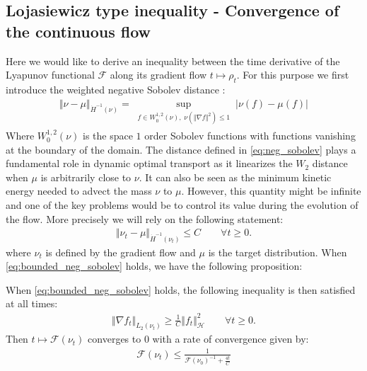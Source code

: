
\subsection{Lojasiewicz type inequality - Convergence of the continuous flow}\label{sec:Lojasiewicz_inequality}

Here we would like to derive an inequality between the time derivative of the Lyapunov functional $\mathcal{F}$ along its gradient flow $t\mapsto \rho_t$. For this purpose we first introduce the weighted negative Sobolev distance :
\begin{align}\label{eq:neg_sobolev}
	\Vert \nu - \mu \Vert_{\dot{H}^{-1}(\nu)} = \sup_{\substack{ f\in W_0^{1,2}(\nu), \; \nu(\Vert \nabla f \Vert^2) \leq 1 }} \vert \nu(f)-\mu(f)\vert 
\end{align}
Where $W_0^{1,2}(\nu)$ is the space $1$ order Sobolev functions with functions vanishing at the boundary of the domain.
The distance defined in \cref{eq:neg_sobolev} plays a fundamental role in dynamic optimal transport as it linearizes the $W_2$ distance when $\mu$ is arbitrarily close to $\nu$. It can also be seen as the minimum kinetic energy needed to advect the mass $\nu$ to $\mu$. However, this quantity might be infinite  and one of the key problems would be to control its value during the evolution of the flow. More precisely we will rely on the following statement:
\begin{align}\label{eq:bounded_neg_sobolev}
	\Vert \nu_t  - \mu \Vert_{\dot{H}^{-1}(\nu_t)} \leq C \qquad \forall t\geq 0.
\end{align} 
where $\nu_t$ is defined by the gradient flow and $\mu$ is the target distribution. When \cref{eq:bounded_neg_sobolev}  holds, we have the following proposition:
\begin{proposition}\label{prop:lojasiewicz}
	When \cref{eq:bounded_neg_sobolev} holds, the following inequality is then satisfied at all times:
	\begin{align}\label{eq:PL_type_inequality}
		\Vert \nabla f_t \Vert_{L_2(\nu_t)} \geq \frac{1}{C} \Vert f_t \Vert^2_{\mathcal{H}} \qquad \forall t\geq 0.
	\end{align}
	Then $t\mapsto \mathcal{F}(\nu_t)$ converges to $0$ with a rate of convergence given by:
	\begin{align}
	\mathcal{F}(\nu_t)\leq \frac{1}{\mathcal{F}(\nu_0)^{-1} + \frac{4t}{C}}
	\end{align}
\end{proposition}



